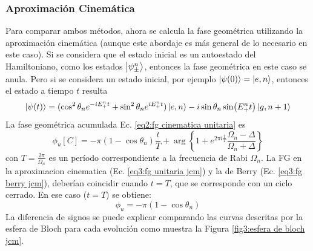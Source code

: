 \subsubsection{Aproximación Cinemática}
Para comparar ambos métodos, ahora se calcula la fase geométrica utilizando la aproximación cinemática (aunque este abordaje es más general de lo necesario en este caso).
Si se considera que el estado inicial es un autoestado del Hamiltoniano, como los estados $\ket{\psi_\pm^n}$, entonces la fase geométrica en este caso se anula. Pero si se considera un estado inicial, por ejemplo $\ket{\psi(0)}=\ket{e,n}$, entonces el estado a tiempo $t$ resulta
\begin{equation}\label{eq3:fg berry jcm}
    \ket{\psi(t)}=(\cos^2\theta_ne^{-iE_+^nt}+\sin^2\theta_ne^{iE_+^nt})\ket{e,n}-i \sin\theta_n\sin(E_+^nt)\ket{g,n+1}
\end{equation}
La fase geométrica acumulada Ec. \ref{eq2:fg cinematica unitaria} es
\begin{equation}\label{eq3:fg unitaria jcm}
    \phi_u[C]=-\pi(1-\cos\theta_n)\frac{t}{T} +\arg\left\{ 1+e^{2\pi i \frac{t}{T}}\frac{\Omega_n-\Delta}{\Omega_n+\Delta} \right\}
\end{equation}
con $T=\frac{2\pi}{\Omega_n}$ es un período correspondiente a la frecuencia de Rabi $\Omega_n$. La FG en la aproximacion cinematica (Ec. \ref{eq3:fg unitaria jcm}) y la de Berry (Ec. \ref{eq3:fg berry jcm}), deberían coincidir cuando $t=T$, que se corresponde con un ciclo cerrado. En ese caso ($t=T$) se obtiene:
\begin{equation}
    \phi_u=-\pi(1-\cos\theta_n)
\end{equation}
La diferencia de signos se puede explicar comparando las curvas descritas por la esfera de Bloch para cada evolución como muestra la Figura \ref{fig3:esfera de bloch jcm}. 

